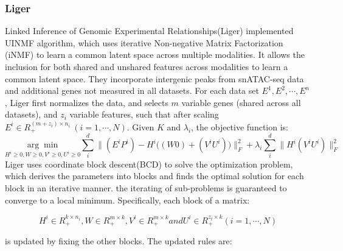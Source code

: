 \subsubsection{Liger}
Linked Inference of Genomic Experimental Relationships(Liger)\citep{kriebel2022uinmf} implemented UINMF algorithm, which uses iterative Non-negative Matrix Factorization (iNMF) to learn a common latent space across multiple modalities. It allows the inclusion for both shared and unshared features across modalities to learn a common latent space. They incorporate intergenic peaks from snATAC-seq data and additional genes not measured in all datasets. For each data set $E^1, E^2, \cdots, E^n$, Liger first normalizes the data, and selects $m$ variable genes (shared across all datasets), and $z_i$ variable features, such that after scaling $E^i \in R_{+}^{(m+z_i)\times n_i}\ (i=1,\cdots,N)$. Given $K$ and $\lambda_i$, the objective function is:
\begin{equation}
	\underset{H^i\geq 0,W\geq 0, V^i\geq 0, U^i \geq 0}{\arg\min} \sum_i^{d}\Big\| (E^i P^i) - H^i \big((W 0) + (V^i U^i)\big)\Big\|_{F}^2 + \lambda_i\sum_i^d\Big\|H^i(V^i U^i)\Big\|_{F}^2
\end{equation}
Liger uses coordinate block descent(BCD) to solve the optimization problem, which derives the parameters into blocks and finds the optimal solution for each block in an iterative manner. the iterating of sub-problems is guaranteed to converge to a local minimum. Specifically, each block of a matrix:

\begin{equation} 
	H^i \in R_+^{k\times n_i}, W \in R_+^{m\times k}, V^i \in R_+^{m\times k} and  U^i \in R_+^{z_i\times k}(i = 1,\cdots, N)
\end{equation}

is updated by fixing the other blocks. The updated rules are:

